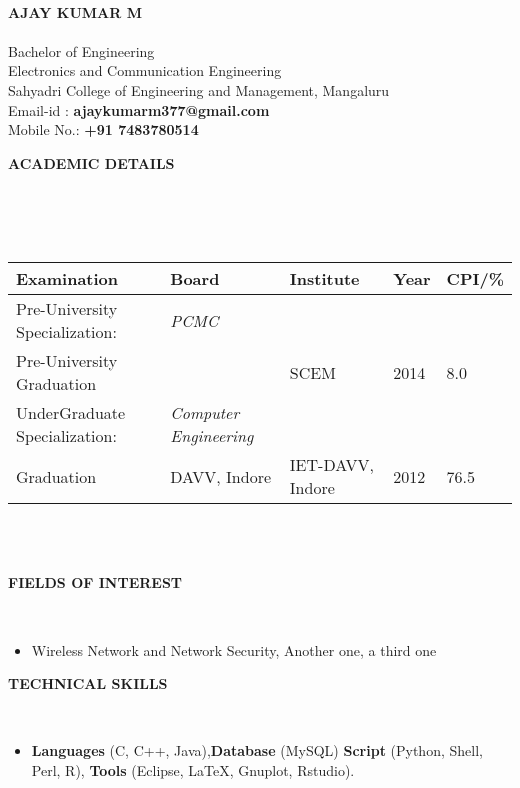 \documentclass[a4paper,10pt]{article}
\newcommand{\lsep}{-0.5cm}
\newcommand{\resheading}[1]{{\small \colorbox{mygrey}{\begin{minipage}{0.975\textwidth}{\textbf{#1 \vphantom{p\^{E}}}}\end{minipage}}}}
\begin{document}
\hspace{0.5cm}\\[-0.2cm]

{\Large\textbf{AJAY KUMAR M}} \\\\
\indent Bachelor of Engineering \\
\indent Electronics and Communication Engineering  \\
\indent Sahyadri College of Engineering and Management, Mangaluru\\
\indent Email-id : \textbf{ajaykumarm377@gmail.com} \\
\indent Mobile No.: \textbf{+91 7483780514} \\



\resheading{\textbf{ACADEMIC DETAILS} }\\[\lsep]
\\ \\
\indent \begin{tabular}{ l @{\hskip 0.15in} l @{\hskip 0.15in} l @{\hskip 0.15in} l @{\hskip 0.15in} l }
\hline
\textbf{Examination} & \textbf{Board} & \textbf{Institute} & \textbf{Year} & \textbf{CPI/\%} \\
\hline
Pre-University Specialization:\,\, & \textit{PCMC} \\
Pre-University Graduation &  & SCEM & 2014 & 8.0 \\
UnderGraduate Specialization: & \textit{Computer Engineering} \\
Graduation & DAVV, Indore & IET-DAVV, Indore & 2012 & 76.5\\
\hline
\end{tabular}
\\ \\

\resheading{\textbf{FIELDS OF INTEREST} }\\[\lsep]
\begin{itemize}
\item \noindent Wireless Network and Network Security, Another one, a third one
\end{itemize}

\resheading{\textbf{TECHNICAL SKILLS} }\\[\lsep]
\begin{itemize}
\item \noindent \textbf{Languages} (C, C++, Java),\textbf{Database} (MySQL) \textbf{Script} (Python, Shell, Perl, R), \textbf{Tools} (Eclipse, \LaTeX, Gnuplot, Rstudio).
\end{itemize}
\end{document}
